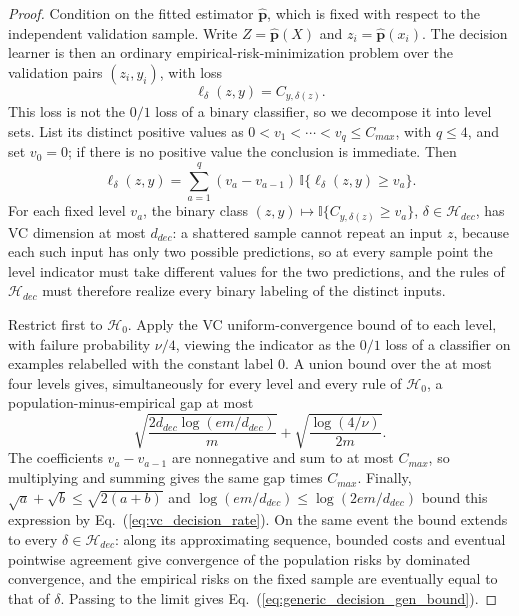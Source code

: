 \begin{proof}
Condition on the fitted estimator $\hat{\mathbf{p}}$, which is fixed with respect to the independent validation sample. Write $Z=\hat{\mathbf{p}}(X)$ and $z_i=\hat{\mathbf{p}}(x_i)$. The decision learner is then an ordinary empirical-risk-minimization problem over the validation pairs $(z_i,y_i)$, with loss
\begin{equation}\label{eq:decision_loss}
    \ell_\delta(z,y)=C_{y,\delta(z)}.
\end{equation}
This loss is not the $0/1$ loss of a binary classifier, so we decompose it into level sets. List its distinct positive values as $0 < v_1 < \cdots < v_q \leq C_{max}$, with $q \leq 4$, and set $v_0 = 0$; if there is no positive value the conclusion is immediate. Then
\begin{equation*}
    \ell_\delta(z,y)=\sum_{a=1}^{q}(v_a-v_{a-1})\,\mathbb{I}\{\ell_\delta(z,y)\geq v_a\}.
\end{equation*}
For each fixed level $v_a$, the binary class $(z,y)\mapsto\mathbb{I}\{C_{y,\delta(z)}\geq v_a\}$, $\delta \in \mathcal{H}_{dec}$, has VC dimension at most $d_{dec}$: a shattered sample cannot repeat an input $z$, because each such input has only two possible predictions, so at every sample point the level indicator must take different values for the two predictions, and the rules of $\mathcal{H}_{dec}$ must therefore realize every binary labeling of the distinct inputs.

Restrict first to $\mathcal{H}_0$. Apply the VC uniform-convergence bound of \citet[Corollary~3.19]{mohri2018foundations} to each level, with failure probability $\nu/4$, viewing the indicator as the $0/1$ loss of a classifier on examples relabelled with the constant label $0$. A union bound over the at most four levels gives, simultaneously for every level and every rule of $\mathcal{H}_0$, a population-minus-empirical gap at most
\begin{equation*}
    \sqrt{\frac{2d_{dec}\log(em/d_{dec})}{m}}+\sqrt{\frac{\log(4/\nu)}{2m}}.
\end{equation*}
The coefficients $v_a - v_{a-1}$ are nonnegative and sum to at most $C_{max}$, so multiplying and summing gives the same gap times $C_{max}$. Finally, $\sqrt{a}+\sqrt{b}\leq\sqrt{2(a+b)}$ and $\log(em/d_{dec})\leq\log(2em/d_{dec})$ bound this expression by Eq.~(\ref{eq:vc_decision_rate}). On the same event the bound extends to every $\delta\in\mathcal{H}_{dec}$: along its approximating sequence, bounded costs and eventual pointwise agreement give convergence of the population risks by dominated convergence, and the empirical risks on the fixed sample are eventually equal to that of $\delta$. Passing to the limit gives Eq.~(\ref{eq:generic_decision_gen_bound}).
\end{proof}

